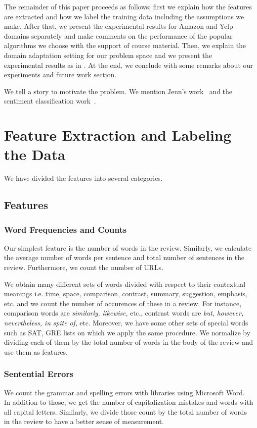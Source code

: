 \documentclass[letterpaper]{article}
\begin{document}
The remainder of this paper proceeds as follows; first we explain how
the features are extracted and how we label the training data
including the assumptions we make. After that, we present the
experimental results for Amazon and Yelp domains separately and make
comments on the performance of the popular algorithms we choose with
the support of course material. Then, we explain the domain adaptation
setting for our problem space and we present the experimental results
as in \cite{JennLearnDiffDomains}. At the end, we conclude with some
remarks about our experiments and future work section.


We tell a story to motivate the problem. We mention Jenn's
work~\cite{JennLearnDiffDomains} and the sentiment classification
work~\cite{PangSentimentClassification}.

\section{Feature Extraction and Labeling the Data}
We have divided the features into several categories.
\subsection{Features}
\label{sec:features}
\subsubsection{Word Frequencies and Counts}
Our simplest feature is the number of words in the review. Similarly,
we calculate the average number of words per sentence and
total number of sentences in the review. Furthermore, we count the
number of URLs.

We obtain many different sets of words divided with respect to their
contextual meanings i.e. time, space, comparison, contrast, summary,
suggestion, emphasis, etc. and we count the number of occurences of
these in a review. For instance, comparison words are
\emph{similarly, likewise,} etc., contrast words are \emph{but,
  however, nevertheless, in spite of,} etc. Moreover, we have some
other sets of special words such as SAT, GRE lists on which we apply the same procedure.  We normalize by dividing each of them by the total
number of words in the body of the review and use them as features.   

\subsubsection{Sentential Errors}
We count the grammar and spelling errors with libraries using
Microsoft Word. In addition to those, we get the number of
capitalization mistakes and words with all capital letters. Similarly, we
divide those count by the total number of words in the review to have
a better sense of measurement.  
\end{document}
